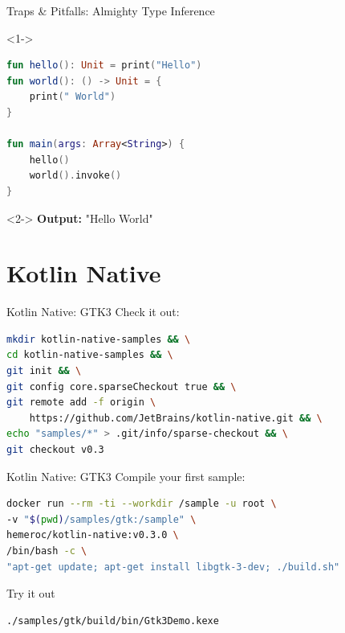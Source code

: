 \begin{frame}[fragile]{Traps \& Pitfalls: Almighty Type Inference}
	\begin{onlyenv}<1->
		\begin{lstlisting}[language=Kotlin]
fun hello(): Unit = print("Hello")
fun world(): () -> Unit = {
	print(" World")
}

fun main(args: Array<String>) {
	hello()
	world().invoke()
}
		\end{lstlisting}
	\end{onlyenv}
	\begin{onlyenv}<2->
		\textbf{Output:} "Hello World"
	\end{onlyenv}
\end{frame}

\section{Kotlin Native}

\begin{frame}[fragile]{Kotlin Native: GTK3}
	Check it out:\\
	\begin{lstlisting}[language=bash,basicstyle=\ttfamily\small]
mkdir kotlin-native-samples && \
cd kotlin-native-samples && \
git init && \
git config core.sparseCheckout true && \
git remote add -f origin \
	https://github.com/JetBrains/kotlin-native.git && \
echo "samples/*" > .git/info/sparse-checkout && \
git checkout v0.3
	\end{lstlisting}
\end{frame}

\begin{frame}[fragile]{Kotlin Native: GTK3}
	Compile your first sample:\\
	\begin{lstlisting}[language=bash,basicstyle=\ttfamily\small]
docker run --rm -ti --workdir /sample -u root \
-v "$(pwd)/samples/gtk:/sample" \
hemeroc/kotlin-native:v0.3.0 \
/bin/bash -c \
"apt-get update; apt-get install libgtk-3-dev; ./build.sh"
	\end{lstlisting}
	Try it out\\
	\begin{lstlisting}[language=bash,basicstyle=\ttfamily\small]
./samples/gtk/build/bin/Gtk3Demo.kexe
	\end{lstlisting}
\end{frame}

